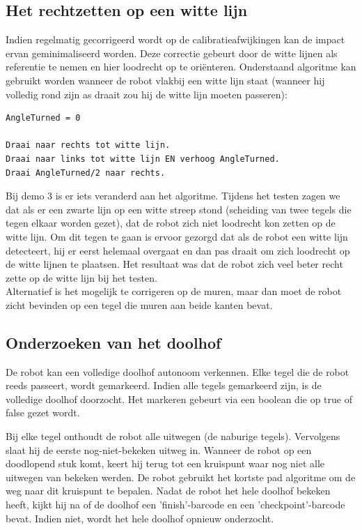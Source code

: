 \documentclass[tt3]{penoverslag}
\begin{document}
\subsection{Het rechtzetten op een witte lijn} %
\label{ssec:algoWitteL}
Indien regelmatig gecorrigeerd wordt op de calibratieafwijkingen kan de impact ervan geminimaliseerd worden. Deze correctie gebeurt door de witte lijnen als referentie te nemen en hier loodrecht op te ori\"enteren.
Onderstaand algoritme kan gebruikt worden wanneer de robot vlakbij een witte lijn staat (wanneer hij volledig rond zijn as draait zou hij de witte lijn moeten passeren):

\lstset{frame=single, caption=Witte Lijn algoritme (pseudocode),
		label=code:algoWitteL, numbers=left, numberstyle=\footnotesize,
		basicstyle=\sffamily, numbersep=5pt}
\begin{lstlisting}
AngleTurned = 0

Draai naar rechts tot witte lijn.
Draai naar links tot witte lijn EN verhoog AngleTurned.
Draai AngleTurned/2 naar rechts.
\end{lstlisting}

Bij demo 3 is er iets veranderd aan het algoritme. Tijdens het testen zagen we dat als er een zwarte lijn op een witte streep stond (scheiding van twee tegels die tegen elkaar worden gezet), dat de robot zich niet loodrecht kon zetten op de witte lijn. Om dit tegen te gaan is ervoor gezorgd dat als de robot een witte lijn detecteert, hij er eerst helemaal overgaat en dan pas draait om zich loodrecht op de witte lijnen te plaatsen. Het resultaat was dat de robot zich veel beter recht zette op de witte lijn bij het testen.\\

Alternatief is het mogelijk te corrigeren op de muren, maar dan moet de robot zicht bevinden op een tegel die muren aan beide kanten bevat.


\subsection{Onderzoeken van het doolhof} %
\label{ssec:algoOnderzDoolhof}
De robot kan een volledige doolhof autonoom verkennen. Elke tegel die de robot reeds passeert, wordt gemarkeerd. Indien alle tegels gemarkeerd zijn, is de volledige doolhof doorzocht. Het markeren gebeurt via een boolean die op true of false gezet wordt.

Bij elke tegel onthoudt de robot alle uitwegen (de naburige tegels). Vervolgens slaat hij de eerste nog-niet-bekeken uitweg in. Wanneer de robot op een doodlopend stuk komt, keert hij terug tot een kruispunt waar nog niet alle uitwegen van bekeken werden. De robot gebruikt het kortste pad algoritme om de weg naar dit kruispunt te bepalen.
Nadat de robot het hele doolhof bekeken heeft, kijkt hij na of de doolhof een 'finish'-barcode en een 'checkpoint'-barcode bevat. Indien niet, wordt het hele doolhof opnieuw onderzocht.\\
\end{document}
